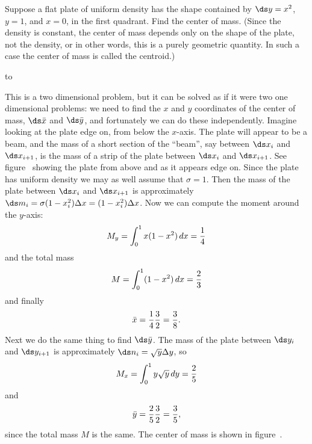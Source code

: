 \begin{example} Suppose a flat plate of uniform density has the shape
contained by $\ds y=x^2$, $y=1$, and $x=0$, in the first quadrant. Find
the center of mass. (Since the density is constant, the center of mass
depends only on the shape of the plate, not the density, or in other
words, this is a purely geometric quantity. In such a case the center
of mass is called the {\dfont centroid}.)

\figure
\hbox to 

This is a two dimensional problem, but it can be solved as if it were
two one dimensional problems: we need to find the $x$ and $y$
coordinates of the center of mass, $\ds \bar x$ and $\ds \bar y$, and
fortunately we can do these independently. Imagine looking at the
plate edge on, from below the $x$-axis. The plate will appear to be a
beam, and the mass of a short section of the ``beam'', say between
$\ds x_i$ and $\ds x_{i+1}$, is the mass of a strip of the plate
between $\ds x_i$ and $\ds x_{i+1}$. See figure~ showing the plate from above and as it appears edge
on. Since the plate has uniform density we may as well assume that
$\sigma=1$. Then the mass of the plate between $\ds x_i$ and $\ds
x_{i+1}$ is approximately $\ds m_i=\sigma(1-x_i^2)\Delta
x=(1-x_i^2)\Delta x$.  Now we can compute the moment around the
$y$-axis:
$$M_y=\int_0^1 x(1-x^2)\,dx={1\over4}$$
and the total mass 
$$M=\int_0^1 (1-x^2)\,dx={2\over3}$$
and finally
$$\bar x = {1\over4}{3\over2}={3\over8}.$$
Next we do the same thing to find $\ds \bar y$. The mass of the plate
between $\ds y_i$ and $\ds y_{i+1}$ is approximately $\ds
n_i=\sqrt{y}\Delta y$, so
$$M_x=\int_0^1 y\sqrt{y}\,dy={2\over5}$$
and
$$\bar y={2\over5}{3\over2}={3\over5},$$
since the total mass $M$ is the same. The center of mass is shown in
figure~.  
\end{example}

